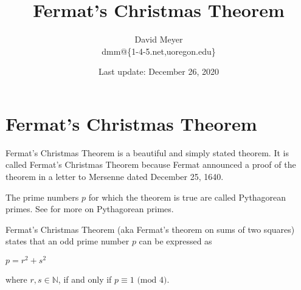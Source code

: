\documentclass[11pt, oneside]{article}   	%
\title{Fermat's Christmas Theorem}
\author{David Meyer \\ dmm@\{1-4-5.net,uoregon.edu\}}
\date{Last update: December 26, 2020}
\theoremstyle{definition}
\begin{document}
\maketitle

\section*{Fermat's Christmas Theorem}

\noindent
Fermat's Christmas Theorem \cite{wiki:christmas_theorem} is a beautiful and simply stated theorem. It is called Fermat's Christmas Theorem because Fermat announced 
a proof of the theorem in a letter to Mersenne dated December 25, 1640. 

\bigskip
\noindent
The prime numbers $p$ for which the theorem is true are called Pythagorean primes. See \cite{wiki:pythagorean_primes} for more on Pythagorean primes.

\bigskip
\noindent
Fermat's Christmas Theorem (aka Fermat's theorem on sums of two squares) states that an odd prime number $p$ can be expressed as

\begin{center}
\scalebox{1.75} {$p = r^{2} + s^{2}$}
\end{center}

\noindent
where $r,s \in \mathbb{N}$, if and only if $p \equiv 1 \textrm{ (mod  $4$)}$.




\end{document}

